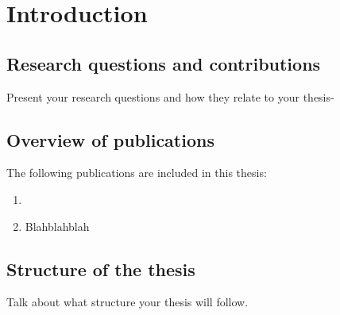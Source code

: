 \chapter{Introduction}
\label{chapter:introduction}

\section{Research questions and contributions}

Present your research questions and how they relate to your thesis-


\section{Overview of publications}

The following publications are included in this thesis:
\begin{enumerate}
    \item {}
    \item Blahblahblah
\end{enumerate}


\section{Structure of the thesis}

Talk about what structure your thesis will follow.